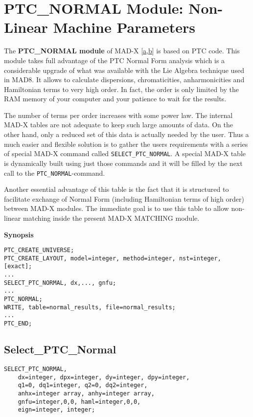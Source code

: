 
\chapter{PTC\_NORMAL Module: Non-Linear Machine Parameters}

The {\bf PTC\_NORMAL module} of MAD-X
[\hyperlink{F._Schmidt}{a},\hyperlink{d Amico}{b}] is based on PTC
code. This module takes full advantage of the PTC Normal Form analysis
which is  a  considerable upgrade of what was available with
the Lie Algebra   technique used in MAD8. It allows to calculate
dispersions, chromaticities,   anharmonicities and Hamiltonian terms to
very high order. In fact, the order is   only limited by the RAM memory
of your computer and your patience to wait for   the results.  

The number of terms per order increases with some power law. The
internal MAD-X   tables are not adequate to keep such large amounts of
data. On the other hand,   only a reduced set of this data is actually
needed by the user. Thus a much   easier and flexible solution is to
gather the users  requirements with a series   of special MAD-X command
called \texttt{SELECT\_PTC\_NORMAL}. A   special MAD-X table is
dynamically built using just those commands and it will   be filled by
the next call to the \texttt{PTC\_NORMAL}-command.  

Another essential advantage of this table is the fact that it is
structured to   facilitate exchange of Normal Form (including
Hamiltonian terms of high order)   between MAD-X modules. The immediate
goal is to use this table to allow   non-linear matching inside the
present MAD-X MATCHING module. 

{\bf Synopsis} \\
\begin{verbatim}
PTC_CREATE_UNIVERSE;
PTC_CREATE_LAYOUT, model=integer, method=integer, nst=integer, [exact];
...
SELECT_PTC_NORMAL, dx,..., gnfu;
...
PTC_NORMAL;
WRITE, table=normal_results, file=normal_results;
...
PTC_END; 
\end{verbatim}

\section{Select\_PTC\_Normal} 

\begin{verbatim}
SELECT_PTC_NORMAL, 
    dx=integer, dpx=integer, dy=integer, dpy=integer,
    q1=0, dq1=integer, q2=0, dq2=integer,         
    anhx=integer array, anhy=integer array, 
    gnfu=integer,0,0, haml=integer,0,0,
    eign=integer, integer;
\end{verbatim}

